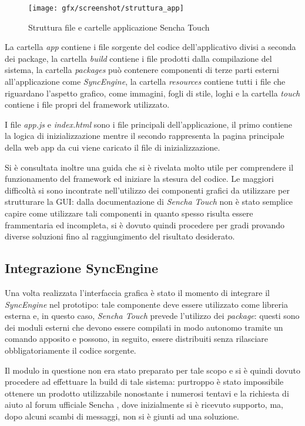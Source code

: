 \begin{figure}[htb]
\centering
\texttt{[image: gfx/screenshot/struttura\_app]}
\caption{Struttura file e cartelle applicazione Sencha Touch}
\label{fig:struttura app sencha touch}
\end{figure}

La cartella \emph{app} contiene i file sorgente del codice dell'applicativo divisi a seconda dei package, la cartella \emph{build} contiene i file prodotti dalla compilazione del sistema, la cartella \emph{packages} può contenere componenti di terze parti esterni all'applicazione come \emph{SyncEngine}, la cartella \emph{resources} contiene tutti i file che riguardano l'aspetto grafico, come immagini, fogli di stile, loghi e la cartella \emph{touch} contiene i file propri del framework utilizzato.

I file \emph{app.js} e \emph{index.html} sono i file principali dell'applicazione, il primo contiene la logica di inizializzazione mentre il secondo rappresenta la pagina principale della web app da cui viene caricato il file di inizializzazione.

Si è consultata inoltre una guida \cite{miamicoder:howto} che si è rivelata molto utile per comprendere il funzionamento del framework ed iniziare la stesura del codice.
Le maggiori difficoltà si sono incontrate nell'utilizzo dei componenti grafici da utilizzare per strutturare la \ac{GUI}: dalla documentazione di \emph{Sencha Touch} non è stato semplice capire come utilizzare tali componenti in quanto spesso risulta essere frammentaria ed incompleta, si è dovuto quindi procedere per gradi provando diverse soluzioni fino al raggiungimento del risultato desiderato.

\subsection{Integrazione SyncEngine}
Una volta realizzata l'interfaccia grafica è stato il momento di integrare il \emph{SyncEngine} nel prototipo: tale componente deve essere utilizzato come libreria esterna e, in questo caso, \emph{Sencha Touch} prevede l'utilizzo dei \emph{package}: questi sono dei moduli esterni che devono essere compilati in modo autonomo tramite un comando apposito e possono, in seguito, essere distribuiti senza rilasciare obbligatoriamente il codice sorgente.

Il modulo in questione non era stato preparato per tale scopo e si è quindi dovuto procedere ad effettuare la build di tale sistema: purtroppo è stato impossibile ottenere un prodotto utilizzabile nonostante i numerosi tentavi e la richiesta di aiuto al forum ufficiale Sencha \cite{sencha:buildingpackage}, dove inizialmente si è ricevuto supporto, ma, dopo alcuni scambi di messaggi, non si è giunti ad una soluzione.

